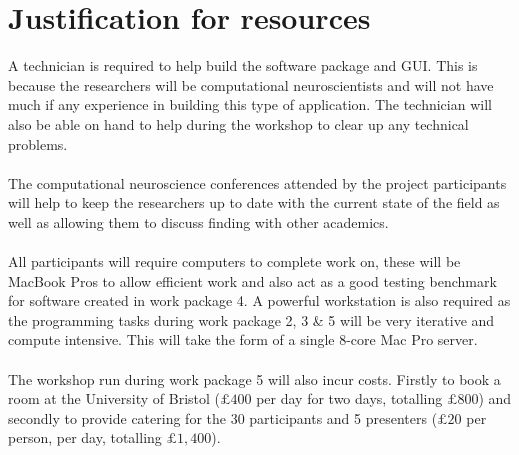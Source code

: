 \documentclass{epsrc}
\begin{document}
\part{Justification for resources}
\noindent
A technician is required to help build the software package and GUI. This is because the researchers will be computational neuroscientists and will not have much if any experience in building this type of application. The technician will also be able on hand to help during the workshop to clear up any technical problems.
\\\\
The computational neuroscience conferences attended by the project participants will help to keep the researchers up to date with the current state of the field as well as allowing them to discuss finding with other academics. 
\\\\
All participants will require computers to complete work on, these will be MacBook Pros to allow efficient work and also act as a good testing benchmark for software created in work package 4. A powerful workstation is also required as the programming tasks during work package 2, 3 \& 5 will be very iterative and compute intensive. This will take the form of a single 8-core Mac Pro server.
\\\\
The workshop run during work package 5 will also incur costs. Firstly to book a room at the University of Bristol ($\pounds 400$ per day for two days, totalling $\pounds 800$) and secondly to provide catering for the 30 participants and 5 presenters ($\pounds 20$ per person, per day, totalling $\pounds 1,400$).
\\
\end{document}
